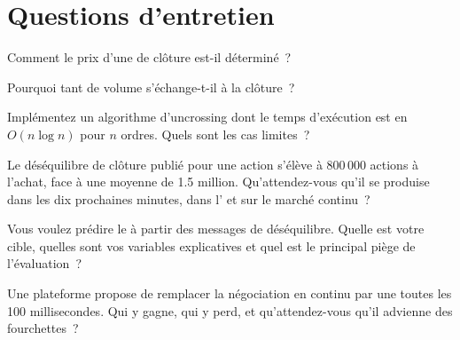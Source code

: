 \section{Questions d'entretien}

\begin{interviewq}\label{iq:m1:auctions:1}
Comment le prix d'une  de clôture est-il déterminé~?
\end{interviewq}

\begin{interviewq}\label{iq:m1:auctions:2}
Pourquoi tant de volume s'échange-t-il à la clôture~?
\end{interviewq}

\begin{interviewq}\label{iq:m1:auctions:3}
Implémentez un algorithme d'uncrossing dont le temps d'exécution est en $O(n \log n)$ pour $n$ ordres.
Quels sont les cas limites~?
\end{interviewq}

\begin{interviewq}\label{iq:m1:auctions:4}
Le déséquilibre de clôture publié pour une action s'élève à 800\,000 actions à l'achat, face
à une  moyenne de 1.5 million. Qu'attendez-vous qu'il se produise dans les
dix prochaines minutes, dans l' et sur le marché continu~?
\end{interviewq}

\begin{interviewq}\label{iq:m1:auctions:5}
Vous voulez prédire le  à partir des messages de déséquilibre. Quelle est votre
cible, quelles sont vos variables explicatives et quel est le principal piège de
l'évaluation~?
\end{interviewq}

\begin{interviewq}\label{iq:m1:auctions:6}
Une plateforme propose de remplacer la négociation en continu par une  toutes les 100
millisecondes. Qui y gagne, qui y perd, et qu'attendez-vous qu'il advienne des
fourchettes~?
\end{interviewq}
